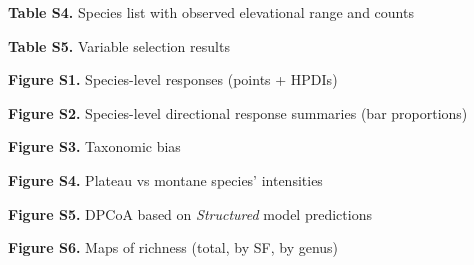 \documentclass[preprint,review,times,12pt,3p]{elsarticle}
\begin{document}
\textbf{Table S4.} Species list with observed elevational range and counts

\textbf{Table S5.} Variable selection results

\textbf{Figure S1.} Species-level responses (points + HPDIs)

\textbf{Figure S2.} Species-level directional response summaries (bar proportions)

\textbf{Figure S3.} Taxonomic bias

\textbf{Figure S4.} Plateau vs montane species' intensities

\textbf{Figure S5.} DPCoA based on \emph{Structured} model predictions

\textbf{Figure S6.} Maps of richness (total, by SF, by genus)




\newpage
\end{document}

